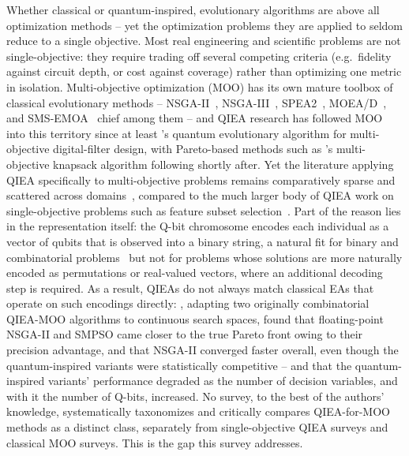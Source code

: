 Whether classical or quantum-inspired, evolutionary algorithms are above
all optimization methods -- yet the optimization problems they are
applied to seldom reduce to a single objective. Most real engineering and
scientific problems are not single-objective: they require trading
off several competing criteria (e.g.\ fidelity
against circuit depth, or cost against coverage) rather than optimizing
one metric in isolation. Multi-objective optimization (MOO) has its own
mature toolbox of classical evolutionary methods --
NSGA-II~\citep{deb2002nsga2}, NSGA-III~\citep{debjain2014nsga3},
SPEA2~\citep{zitzler2001spea2}, MOEA/D~\citep{zhangli2007moead}, and
SMS-EMOA~\citep{beume2007smsemoa} chief among them -- and QIEA research
has followed MOO into this territory since at least
\citet{zhang2003nqea}'s quantum evolutionary algorithm for
multi-objective digital-filter design, with Pareto-based methods such as
\citet{kim2006qmea}'s multi-objective knapsack algorithm following
shortly after.
Yet the literature applying QIEA specifically to multi-objective problems
remains comparatively sparse and scattered across
domains~\citep{olvera2023continuous,guzel2022qnsga2,kumar2026eahqnsga2},
compared to the much larger body of QIEA work on single-objective
problems such as feature subset
selection~\citep{zhang2011qieasurvey,vivek2025fss}. Part of the reason lies in the
representation itself: the Q-bit chromosome encodes each individual as
a vector of qubits that is observed into a binary string, a natural fit
for binary and combinatorial problems~\citep{han2002qea} but not for
problems whose solutions are more naturally encoded as permutations or
real-valued vectors, where an additional decoding step is required. As
a result, QIEAs do not always match classical EAs that operate on such
encodings directly: \citet{olvera2023continuous}, adapting two
originally combinatorial QIEA-MOO algorithms to continuous search
spaces, found that floating-point NSGA-II and SMPSO came closer to the
true Pareto front owing to their precision advantage, and that NSGA-II
converged faster overall, even though the quantum-inspired variants
were statistically competitive -- and that the quantum-inspired
variants' performance degraded as the number of decision variables,
and with it the number of Q-bits, increased. No survey, to the best of the authors' knowledge, systematically
taxonomizes and critically compares QIEA-for-MOO methods as a distinct
class, separately from single-objective QIEA surveys and classical MOO
surveys. This is the gap this survey addresses.

